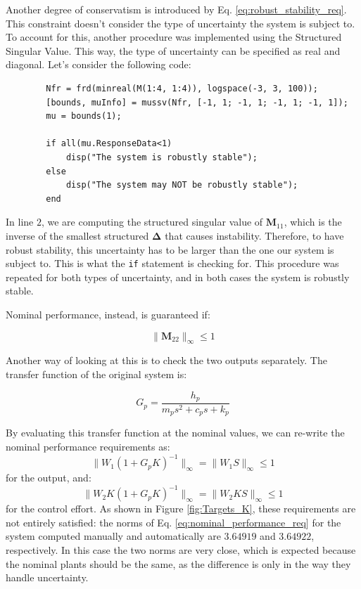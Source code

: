 \documentclass{scrreprt}
\begin{document}
Another degree of conservatism is introduced by Eq. \ref{eq:robust_stability_req}. This constraint doesn't consider the type of uncertainty the system is subject to. To account for this, another procedure was implemented using the Structured Singular Value. This way, the type of uncertainty can be specified as real and diagonal. Let's consider the following code:

\begin{center}
    \begin{verbatim}
        Nfr = frd(minreal(M(1:4, 1:4)), logspace(-3, 3, 100));
        [bounds, muInfo] = mussv(Nfr, [-1, 1; -1, 1; -1, 1; -1, 1]);
        mu = bounds(1);
        
        if all(mu.ResponseData<1)
            disp("The system is robustly stable");
        else
            disp("The system may NOT be robustly stable");
        end
    \end{verbatim}
    \label{code:robust_procedure}
\end{center}

In line $2$, we are computing the structured singular value of $\boldsymbol{M}_{11}$, which is the inverse of the smallest structured $\boldsymbol{\Delta}$ that causes instability. Therefore, to have robust stability, this uncertainty has to be larger than the one our system is subject to. This is what the \texttt{if} statement is checking for. This procedure was repeated for both types of uncertainty, and in both cases the system is robustly stable.


Nominal performance, instead, is guaranteed if:

\begin{equation}
\|\boldsymbol{M}_{22}\|_{\infty}\leq 1
\label{eq:nominal_performance_req}
\end{equation}

Another way of looking at this is to check the two outputs separately. The transfer function of the original system is:

\begin{equation}
    G_p = \frac{h_p}{m_p s^2 + c_p s+k_p}
\end{equation}

By evaluating this transfer function at the nominal values, we can re-write the nominal performance requirements as:
\begin{equation}
\|W_1(1 + G_pK)^{-1}\|_{\infty}=\|W_1S\|_{\infty}\leq 1
\end{equation}
for the output, and:
\begin{equation}
\|W_2K(1 + G_pK)^{-1}\|_{\infty}=\|W_2KS\|_{\infty}\leq 1
\end{equation}
for the control effort.
As shown in Figure \ref{fig:Targets_K}, these requirements are not entirely satisfied: the norms of Eq. \ref{eq:nominal_performance_req} for the system computed manually and automatically are $3.64919$ and $3.64922$, respectively. In this case the two norms are very close, which is expected because the nominal plants should be the same, as the difference is only in the way they handle uncertainty.
\end{document}
